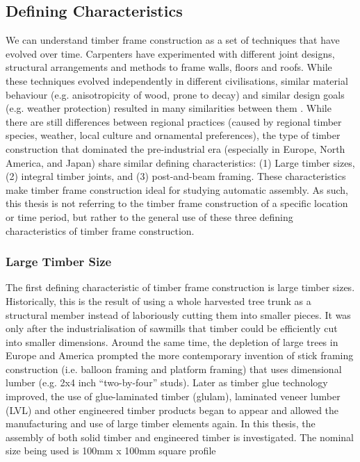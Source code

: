 \subsection{Defining Characteristics}
\label{subsection:introduction_defining_characteristics}

We can understand timber frame construction as a set of techniques that have evolved over time. Carpenters have experimented with different joint designs, structural arrangements and methods to frame walls, floors and roofs. While these techniques evolved independently in different civilisations, similar material behaviour (e.g. anisotropicity of wood, prone to decay) and similar design goals (e.g. weather protection) resulted in many similarities between them \parencite{zwergerWoodWoodJoints2012}.
While there are still differences between regional practices (caused by regional timber species, weather, local culture and ornamental preferences), the type of timber construction that dominated the pre-industrial era (especially in Europe, North America, and Japan) share similar defining characteristics: (1) Large timber sizes, (2) integral timber joints, and (3) post-and-beam framing. 
These characteristics make timber frame construction ideal for studying automatic assembly.
As such, this thesis is not referring to the timber frame construction of a specific location or time period, but rather to the general use of these three defining characteristics of timber frame construction.

\subsubsection{Large Timber Size}
\label{subsubsection:introduction_large_timber_size}

The first defining characteristic of timber frame construction is large timber sizes.
Historically, this is the result of using a whole harvested tree trunk as a structural member instead of laboriously cutting them into smaller pieces.
It was only after the industrialisation of sawmills that timber could be efficiently cut into smaller dimensions.
Around the same time, the depletion of large trees in Europe and America prompted the more contemporary invention of stick framing construction (i.e. balloon framing and platform framing) that uses dimensional lumber (e.g. 2x4 inch “two-by-four” studs). Later as timber glue technology improved, the use of glue-laminated timber (glulam), laminated veneer lumber (LVL) and other engineered timber products began to appear and allowed the manufacturing and use of large timber elements again.
In this thesis, the assembly of both solid timber and engineered timber is investigated.
The nominal size being used is 100mm x 100mm square profile 

